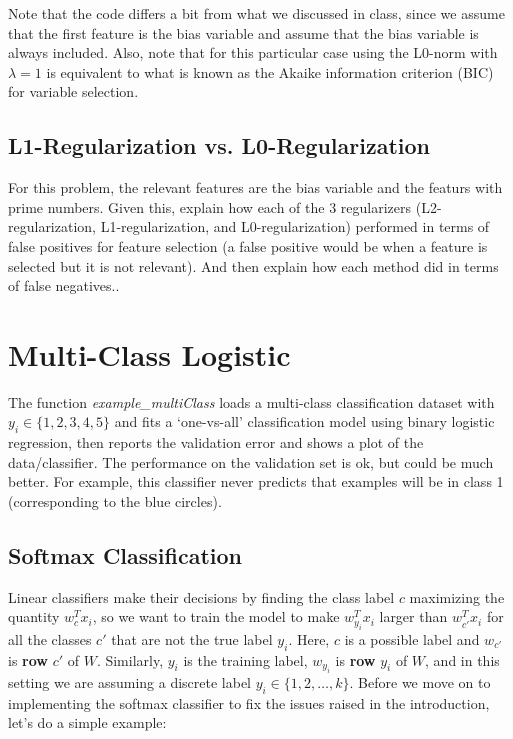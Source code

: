 \documentclass{article}
\def\blu#1{{\color{blu}#1}}
\begin{document}
Note that the code differs a bit from what we discussed in class, since we assume that the first feature is the bias variable and assume that the bias variable is always included. Also, note that for this particular case using the L0-norm with $\lambda=1$ is equivalent to what is known as the Akaike information criterion (BIC) for variable selection.

\pagebreak

\subsection{L1-Regularization vs. L0-Regularization}

For this problem, the relevant features are the bias variable and the featurs with prime numbers. Given this, \blu{explain how each of the 3 regularizers (L2-regularization, L1-regularization, and L0-regularization) performed in terms of false positives for feature selection (a false positive would be when a feature is selected but it is not relevant). And then explain how each method did in terms of false negatives..}

\pagebreak


\section{Multi-Class Logistic}

The function \emph{example\_multiClass} loads a multi-class classification dataset with $y_i \in \{1,2,3,4,5\}$ and fits a `one-vs-all' classification model using binary logistic regression, then reports the validation error and shows a plot of the data/classifier. The performance on the validation set is ok, but could be much better. For example, this classifier never  predicts that examples will be in class 1 (corresponding to the blue circles).

\subsection{Softmax Classification}

Linear classifiers make their decisions by finding the class label $c$ maximizing the quantity $w_c^Tx_i$, so we want to train the model to make $w_{y_i}^Tx_i$ larger than $w_{c'}^Tx_i$ for all the classes $c'$ that are not the true label $y_i$.
Here, $c$ is a possible label and $w_{c'}$ is \textbf{row} $c'$ of $W$. Similarly, $y_i$ is the training label, $w_{y_i}$ is \textbf{row} $y_i$ of $W$, and in this setting we are assuming a discrete label $y_i \in \{1,2,\dots,k\}$. Before we move on to implementing the softmax classifier to fix the issues raised in the introduction, let's do a simple example:
\end{document}
